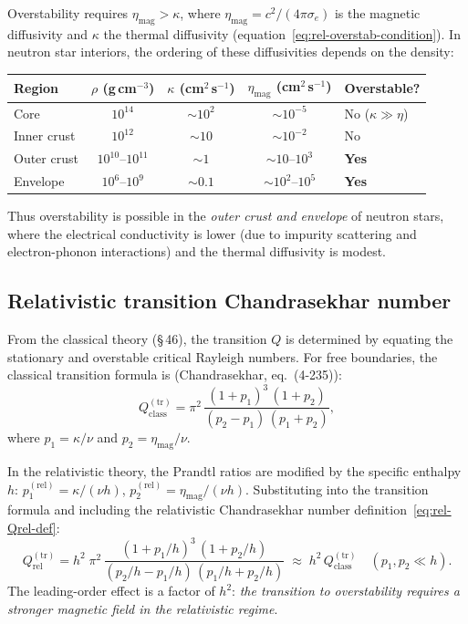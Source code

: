 Overstability requires $\eta_{\mathrm{mag}} > \kappa$, where
$\eta_{\mathrm{mag}} = c^2/(4\pi\sigma_e)$ is the magnetic
diffusivity and $\kappa$ the thermal diffusivity
(equation~\eqref{eq:rel-overstab-condition}).  In neutron star
interiors, the ordering of these diffusivities depends on the
density:

\begin{center}
\renewcommand{\arraystretch}{1.2}
\begin{tabular}{lcccl}
\hline
\textbf{Region} & $\rho$ (g\,cm$^{-3}$) & $\kappa$ (cm$^2$\,s$^{-1}$)
  & $\eta_{\mathrm{mag}}$ (cm$^2$\,s$^{-1}$) & \textbf{Overstable?} \\
\hline
Core & $10^{14}$ & $\sim 10^2$ & $\sim 10^{-5}$ & No ($\kappa \gg \eta$) \\
Inner crust & $10^{12}$ & $\sim 10$ & $\sim 10^{-2}$ & No \\
Outer crust & $10^{10}$--$10^{11}$ & $\sim 1$ & $\sim 10$--$10^3$ & \textbf{Yes} \\
Envelope & $10^{6}$--$10^{9}$ & $\sim 0.1$ & $\sim 10^2$--$10^5$ & \textbf{Yes} \\
\hline
\end{tabular}
\end{center}

\noindent Thus overstability is possible in the \emph{outer crust
and envelope} of neutron stars, where the electrical conductivity
is lower (due to impurity scattering and electron-phonon
interactions) and the thermal diffusivity is modest.

\subsection{Relativistic transition Chandrasekhar number}
\label{subsec:rel-46-Qtr-formula}

From the classical theory (\S\,46), the transition $Q$ is determined
by equating the stationary and overstable critical Rayleigh numbers.
For free boundaries, the classical transition formula is
(Chandrasekhar, eq.~(4-235)):
\begin{equation}
Q_{\mathrm{class}}^{(\mathrm{tr})}
= \pi^2\,\frac{(1 + p_1)^3\,(1 + p_2)}{(p_2 - p_1)\,(p_1 + p_2)},
\label{eq:rel-Qtr-class}
\end{equation}
where $p_1 = \kappa/\nu$ and $p_2 = \eta_{\mathrm{mag}}/\nu$.

In the relativistic theory, the Prandtl ratios are modified by the
specific enthalpy $h$:
$p_1^{(\mathrm{rel})} = \kappa/(\nu h)$,
$p_2^{(\mathrm{rel})} = \eta_{\mathrm{mag}}/(\nu h)$.
Substituting into the transition formula and including the
relativistic Chandrasekhar number definition~\eqref{eq:rel-Qrel-def}:
\begin{equation}
\boxed{
Q_{\mathrm{rel}}^{(\mathrm{tr})}
= h^2\;\pi^2\,
  \frac{(1 + p_1/h)^3\,(1 + p_2/h)}
       {(p_2/h - p_1/h)\,(p_1/h + p_2/h)}
\;\approx\; h^2\,Q_{\mathrm{class}}^{(\mathrm{tr})}
  \quad (p_1, p_2 \ll h).
}
\label{eq:rel-Qtr-formula}
\end{equation}
The leading-order effect is a factor of $h^2$: \emph{the transition
to overstability requires a stronger magnetic field in the
relativistic regime}.

